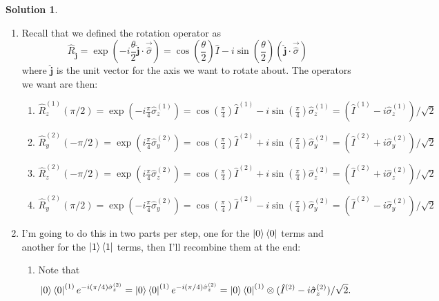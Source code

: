 \documentclass[10pt]{article}
\theoremstyle{definition}
\newtheorem{soln}{Solution}
\newcommand{\uv}[1]{\hat{\bm{{#1}}}}
\begin{document}
\begin{soln}
  \begin{enumerate}[label=(\alph*)]
    \item Recall that we defined the rotation operator as
          $$\hat{R}_{\uv{j}}=\exp\left(-i\frac{\theta}{2}\uv{j}\cdot\vec{\hat{\sigma}}\right)=\cos\left(\frac{\theta}{2}\right)\hat{I}-i\sin\left(\frac{\theta}{2}\right)(\uv{j}\cdot \vec{\hat{\sigma}})$$
          where $\uv{j}$ is the unit vector for the axis we want to rotate about. The operators we want are then:
          \begin{enumerate}[label=(\roman*)]
            \item $\hat{R}_z^{(1)}(\pi/2)=\exp\left(-i\frac{\pi}{4}\hat{\sigma}_z^{(1)}\right)
                    =\cos\left(\frac{\pi}{4}\right)\hat{I}^{(1)}-i\sin\left(\frac{\pi}{4}\right)\hat{\sigma}_z^{(1)}
                    =(\hat{I}^{(1)}-i\hat{\sigma}_z^{(1)})/\sqrt{2}$
            \item $\hat{R}_y^{(2)}(-\pi/2)=\exp\left(i\frac{\pi}{4}\hat{\sigma}_y^{(2)}\right)
                    =\cos\left(\frac{\pi}{4}\right)\hat{I}^{(2)}+i\sin\left(\frac{\pi}{4}\right)\hat{\sigma}_y^{(2)}
                    =(\hat{I}^{(2)}+i\hat{\sigma}_y^{(2)})/\sqrt{2}
                  $
            \item $\hat{R}_z^{(2)}(-\pi/2)=\exp\left(i\frac{\pi}{4}\hat{\sigma}_z^{(2)}\right)
                    =\cos\left(\frac{\pi}{4}\right)\hat{I}^{(2)}+i\sin\left(\frac{\pi}{4}\right)\hat{\sigma}_z^{(2)}
                    =(\hat{I}^{(2)}+i\hat{\sigma}_z^{(2)})/\sqrt{2}
                  $
            \item $
                    \hat{R}_y^{(2)}(\pi/2)
                    =\exp\left(-i\frac{\pi}{4}\hat{\sigma}_y^{(2)}\right)
                    =\cos\left(\frac{\pi}{4}\right)\hat{I}^{(2)}-i\sin\left(\frac{\pi}{4}\right)\hat{\sigma}_y^{(2)}
                    =(\hat{I}^{(2)}-i\hat{\sigma}_y^{(2)})/\sqrt{2}
                  $
          \end{enumerate}
    \item I'm going to do this in two parts per step, one for the $\ket{0}\bra{0}$ terms and another for the $\ket{1}\bra{1}$ terms, then I'll recombine them at the end:
          \begin{enumerate}[label=(\arabic*)]
            \item Note that
                  $$\ket{0}\bra{0}^{(1)}e^{-i(\pi/4)\hat{\sigma}_z^{(2)}}=\ket{0}\bra{0}^{(1)}e^{-i(\pi/4)\hat{\sigma}_z^{(2)}}=\ket{0}\bra{0}^{(1)}\otimes(\hat{I}^{(2)}-i\hat{\sigma}_z^{(2)})/\sqrt{2}.$$

\end{enumerate}
\end{enumerate}
\end{soln}
\end{document}
